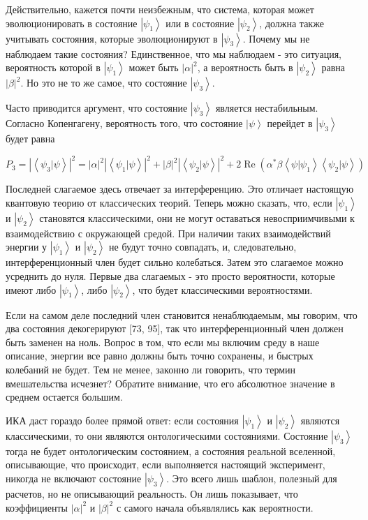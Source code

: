 \documentclass[main.tex]{subfiles}
\begin{document}
Действительно, кажется почти неизбежным, что система, которая может эволюционировать в состояние $\left|\psi_1\right>$ или в состояние $\left|\psi_2\right>$, должна также учитывать состояния, которые эволюционируют в $\left|\psi_3\right>$. Почему мы не наблюдаем такие состояния? Единственное, что мы наблюдаем - это ситуация, вероятность которой в $\left|\psi_1\right>$ может быть $|\alpha|^2$, а вероятность быть в $\left|\psi_2\right>$ равна $|\beta|^2$. Но это не то же самое, что состояние $\left|\psi_3\right>$.

Часто приводится аргумент, что состояние $\left|\psi_3\right>$ является нестабильным. Согласно Копенгагену, вероятность того, что состояние $\left|\psi\right>$ перейдет в $\left|\psi_3\right>$ будет равна

\begin{equation}\label{3.3}
	P_{3}=\left|\left\langle\psi_{3} | \psi\right\rangle\right|^{2}=|\alpha|^{2}\left|\left\langle\psi_{1} | \psi\right\rangle\right|^{2}+|\beta|^{2}\left|\left\langle\psi_{2} | \psi\right\rangle\right|^{2}+2 \operatorname{Re}\left(\alpha^{*} \beta\left\langle\psi | \psi_{1}\right\rangle\left\langle\psi_{2} | \psi\right\rangle\right)
\end{equation}

Последней слагаемое здесь отвечает за интерференцию. Это отличает настоящую квантовую теорию от классических теорий. Теперь можно сказать, что, если $\left|\psi_1\right>$ и $\left|\psi_2\right>$ становятся классическими, они не могут оставаться невосприимчивыми к взаимодействию с окружающей средой. При наличии таких взаимодействий энергии у $\left|\psi_1\right>$ и $\left|\psi_2\right>$ не будут точно совпадать, и, следовательно, интерференционный член будет сильно колебаться. Затем это слагаемое можно усреднить до нуля. Первые два слагаемых - это просто вероятности, которые имеют либо $\left|\psi_1\right>$, либо $\left|\psi_2\right>$, что будет классическими вероятностями.

Если на самом деле последний член становится ненаблюдаемым, мы говорим, что два состояния декогерируют [73, 95], так что интерференционный член должен быть заменен на ноль. Вопрос в том, что если мы включим среду в наше описание, энергии все равно должны быть точно сохранены, и быстрых колебаний не будет. Тем не менее, законно ли говорить, что термин вмешательства исчезнет? Обратите внимание, что его абсолютное значение в среднем остается большим.

ИКА даст гораздо более прямой ответ: если состояния $\left|\psi_1\right>$ и $\left|\psi_2\right>$ являются классическими, то они являются онтологическими состояниями. Состояние $\left|\psi_3\right>$ тогда не будет онтологическим состоянием, а состояния реальной вселенной, описывающие, что происходит, если выполняется настоящий эксперимент, никогда не включают состояние $\left|\psi_3\right>$. Это всего лишь шаблон, полезный для расчетов, но не описывающий реальность. Он лишь показывает, что коэффициенты $|\alpha|^2$ и $|\beta|^2$ с самого начала объявлялись как вероятности.
\end{document}
